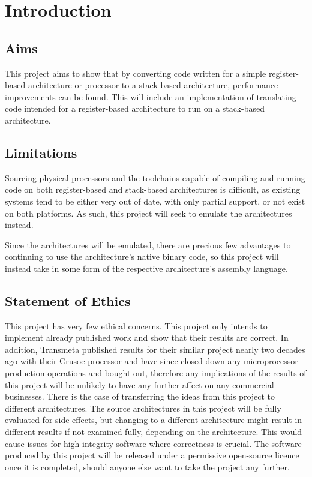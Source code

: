 \chapter{Introduction}\label{ch:introduction}
\section{Aims}
This project aims to show that by converting code written for a simple
register-based architecture or processor to a stack-based architecture,
performance improvements can be found. This will include an implementation of
translating code intended for a register-based architecture to run on a
stack-based architecture.

\section{Limitations}
Sourcing physical processors and the toolchains capable of compiling and running
code on both register-based and stack-based architectures is difficult, as
existing systems tend to be either very out of date, with only partial support,
or not exist on both platforms. As such, this project will seek to emulate the
architectures instead.

Since the architectures will be emulated, there are precious few advantages to
continuing to use the architecture's native binary code, so this project will
instead take in some form of the respective architecture's assembly language.

\section{Statement of Ethics}
This project has very few ethical concerns. This project only intends to
implement already published work and show that their results are correct. In
addition, Transmeta published results for their similar project nearly two
decades ago with their Crusoe processor and have since closed down any
microprocessor production operations and bought out, therefore any implications
of the results of this project will be unlikely to have any further affect on
any commercial businesses.  There is the case of transferring the ideas from
this project to different architectures. The source architectures in this
project will be fully evaluated for side effects, but changing to a different
architecture might result in different results if not examined fully, depending
on the architecture. This would cause issues for high-integrity software where
correctness is crucial. The software produced by this project will be released
under a permissive open-source licence once it is completed, should anyone else
want to take the project any further.

